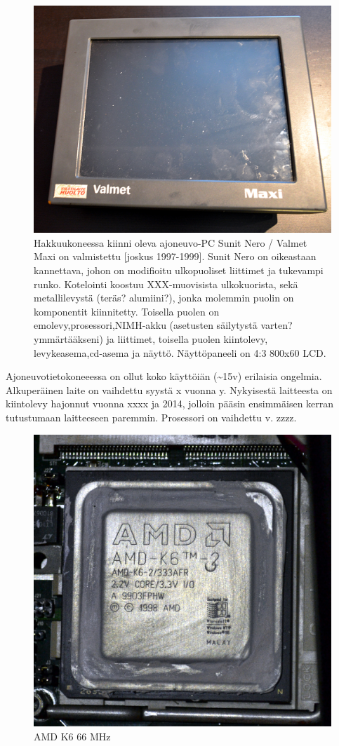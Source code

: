 \documentclass[]{article}
\begin{document}
\begin{figure}
\centering
\includegraphics[width=1.000\hsize]{../pictures/valmet_maxi.jpg}
\caption{Hakkuukoneessa kiinni oleva ajoneuvo-PC Sunit Nero / Valmet
Maxi on valmistettu {[}joskus 1997-1999{]}. Sunit Nero on oikeastaan
kannettava, johon on modifioitu ulkopuoliset liittimet ja tukevampi
runko. Kotelointi koostuu XXX-muovisista ulkokuorista, sekä
metallilevystä (teräs? alumiini?), jonka molemmin puolin on komponentit
kiinnitetty. Toisella puolen on emolevy,prosessori,NIMH-akku (asetusten
säilytystä varten? ymmärtääkseni) ja liittimet, toisella puolen
kiintolevy, levykeasema,cd-asema ja näyttö. Näyttöpaneeli on 4:3 800x60
LCD.}\label{Nero}
\end{figure}

Ajoneuvotietokoneeessa on ollut koko käyttöiän (\textasciitilde{}15v)
erilaisia ongelmia. Alkuperäinen laite on vaihdettu syystä x vuonna y.
Nykyisestä laitteesta on kiintolevy hajonnut vuonna xxxx ja 2014,
jolloin pääsin ensimmäisen kerran tutustumaan laitteeseen paremmin.
Prosessori on vaihdettu v. zzzz.

\begin{figure}
\centering
\includegraphics[width=0.500\hsize]{../pictures/processor.jpg}
\caption{AMD K6 66 MHz}\label{AMDK6}
\end{figure}
\end{document}
